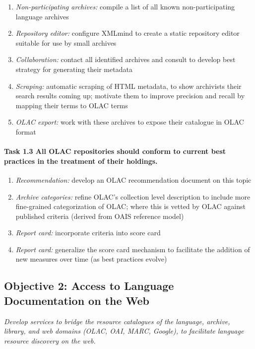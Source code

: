 \begin{enumerate}[label=\emph{\task\alph*}]
\item \emph{Non-participating archives:}
  compile a list of all known non-participating language archives
\item \emph{Repository editor:}
  configure XMLmind to create a static repository editor suitable
  for use by small archives
\item \emph{Collaboration:}
  contact all identified archives and consult to develop best
  strategy for generating their metadata
\item \emph{Scraping:}
  automatic scraping of HTML metadata, to show archivists
  their search results coming up; motivate them to improve precision
  and recall by mapping their terms to OLAC terms
\item \emph{OLAC export:}
  work with these archives to expose their catalogue in OLAC format
\end{enumerate}

\def\task{1.3}
\paragraph{Task {\task} All OLAC repositories should conform to current best practices
      in the treatment of their holdings.}

\begin{enumerate}[label=\emph{\task\alph*}]
\item \emph{Recommendation:}
  develop an OLAC recommendation document on this topic
\item \emph{Archive categories:}
  refine OLAC's collection level description to include
  more fine-grained categorization of OLAC; where this is vetted
  by OLAC against published criteria (derived from OAIS reference model)
\item \emph{Report card:}
  incorporate criteria into score card
\item \emph{Report card:}
  generalize the score card mechanism to facilitate the addition
  of new measures over time (as best practices evolve)
\end{enumerate}

\subsection*{Objective 2: Access to Language Documentation on the Web}

\emph{Develop services to bridge the resource catalogues of the
  language, archive, library, and web domains (OLAC, OAI, MARC,
  Google), to facilitate language resource discovery on the web.}

